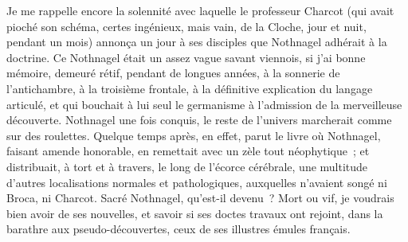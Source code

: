 \documentclass[french,twoside]{book} %
\begin{document}
Je me rappelle encore la solennité avec laquelle le professeur Charcot (qui avait pioché son schéma, certes ingénieux, mais vain, de la Cloche, jour et nuit, pendant un mois) annonça un jour à ses disciples que Nothnagel adhérait à la doctrine. Ce Nothnagel était un assez vague savant viennois, si j’ai bonne mémoire, demeuré rétif, pendant de longues années, à la sonnerie de l’antichambre, à la troisième frontale, à la définitive explication du langage articulé, et qui bouchait à lui seul le germanisme à l’admission de la merveilleuse découverte. Nothnagel une fois conquis, le reste de l’univers marcherait comme sur des roulettes. Quelque temps après, en effet, parut le livre où Nothnagel, faisant amende honorable, en remettait avec un zèle tout néophytique ; et distribuait, à tort et à travers, le long de l’écorce cérébrale, une multitude d’autres localisations normales et pathologiques, auxquelles n’avaient songé ni Broca, ni Charcot. Sacré Nothnagel, qu’est-il devenu ? Mort ou vif, je voudrais bien avoir de ses nouvelles, et savoir si ses doctes travaux ont rejoint, dans la barathre aux pseudo-découvertes, ceux de ses illustres émules français.\par
\end{document}
